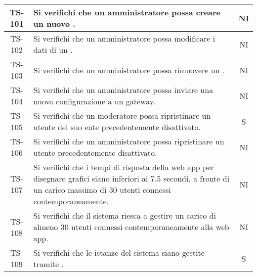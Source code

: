 \begin{center}
\begin{longtable}{|c|p{10cm}|c|}
			 \hline
			 TS-101 & Si verifichi che un amministratore possa creare un nuovo \glock{gateway}. & NI \\
			 \hline
			 TS-102 & Si verifichi che un amministratore possa modificare i dati di un \glock{gateway}. & NI \\
			 \hline
			 TS-103 & Si verifichi che un amministratore possa rimuovere un \glock{gateway}. & NI \\
			 \hline
			 TS-104 & Si verifichi che un amministratore possa inviare una nuova configurazione a un gateway. & NI \\
			 \hline
			 TS-105 & Si verifichi che un moderatore possa ripristinare un utente del suo ente precedentemente disattivato. & S \\
			 \hline
			 TS-106 & Si verifichi che un amministratore possa ripristinare un utente precedentemente disattivato. & NI \\
			 \hline
			 TS-107 & Si verifichi che i tempi di risposta della web app per disegnare grafici siano inferiori ai 7.5 secondi, a fronte di un carico massimo di 30 utenti connessi contemporaneamente. & NI \\
			 \hline
			 TS-108 & Si verifichi che il sistema riesca a gestire un carico di almeno 30 utenti connessi contemporaneamente alla web app. & NI \\
			 \hline
			 TS-109 & Si verifichi che le istanze del sistema siano gestite tramite \glock{Docker}. & S \\

\end{longtable}
\end{center}

